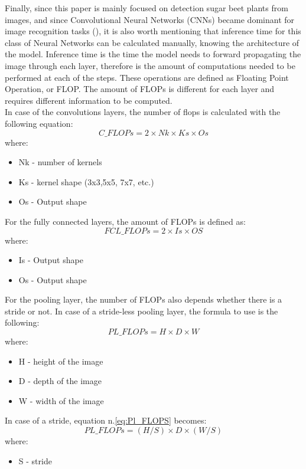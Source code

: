 Finally, since this paper is mainly focused on detection sugar beet plants from images, and since Convolutional Neural Networks (CNNs) became dominant for image recognition tasks (\cite{articleCNN}), it is also worth mentioning that inference time for this class of Neural Networks can be calculated manually, knowing the architecture of the model. Inference time is the time the model needs to forward propagating the image through each layer, therefore is the amount of computations needed to be performed at each of the steps. These operations are defined as Floating Point Operation, or FLOP. The amount of FLOPs is different for each layer and requires different information to be computed. \\
In case of the convolutions layers, the number of flops is calculated with the following equation:
\begin{equation}
C\_FLOPs = 2\times Nk \times Ks \times Os
\end{equation}
where:
\begin{itemize}
\item[] Nk - number of kernels
\item[] Ks - kernel shape (3x3,5x5, 7x7, etc.)
\item[] Os - Output shape
\end{itemize}
For the fully connected layers, the amount of FLOPs is defined as:
\begin{equation}
FCL\_FLOPs = 2\times Is \times OS
\end{equation}
where:
\begin{itemize}
\item[] Is - Output shape
\item[] Os - Output shape
\end{itemize}
For the pooling layer, the number of FLOPs also depends whether there is a stride or not. In case of a stride-less pooling layer, the formula to use is the following:
\begin{equation}
PL\_FLOPs = H \times D \times W
\label{eq:Pl_FLOPS}
\end{equation}
where:
\begin{itemize}
\item[] H - height of the image
\item[] D - depth of the image
\item[] W - width of the image
\end{itemize}
In case of a stride, equation n.\ref{eq:Pl_FLOPS} becomes:
\begin{equation}
PL\_FLOPs = (H/S) \times D \times (W/S)
\end{equation}
where:
\begin{itemize}
\item[] S - stride
\end{itemize}

